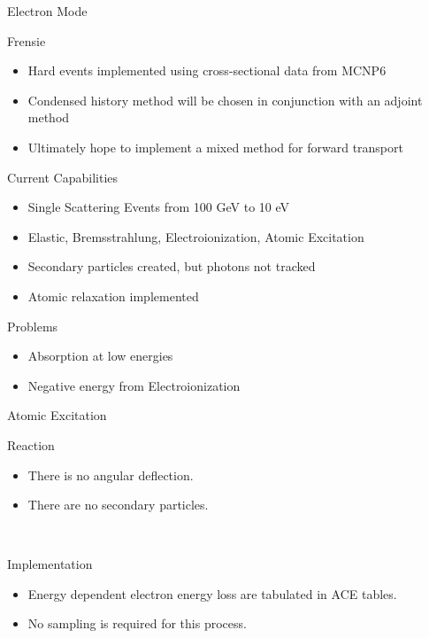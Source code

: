 \documentclass{beamer}
\begin{document}
\begin{frame}{Electron Mode}

  \begin{block}{Frensie}
    \begin{itemize}
      \item Hard events implemented using cross-sectional data from MCNP6
      \item Condensed history method will be chosen in conjunction with an adjoint method
      \item Ultimately hope to implement a mixed method for forward transport
    \end{itemize}    
  \end{block}
  
  \begin{block}{Current Capabilities}
    \begin{itemize}
      \item Single Scattering Events from 100 GeV to 10 eV
      \item Elastic, Bremsstrahlung, Electroionization, Atomic Excitation 
      \item Secondary particles created, but photons not tracked
      \item Atomic relaxation implemented
    \end{itemize}
  \end{block}
    
  \begin{block}{Problems}
    \begin{itemize}
      \item Absorption at low energies
      \item Negative energy from Electroionization
    \end{itemize}    
  \end{block}  

\end{frame}

\begin{frame}{Atomic Excitation}

  \begin{block}{Reaction}
    \begin{itemize}
      \item There is no angular deflection.
      \item There are no secondary particles.
    \end{itemize}
  \end{block}  

~~\\
  \begin{block}{Implementation}
    \begin{itemize}
      \item Energy dependent electron energy loss are tabulated in ACE tables.
      \item No sampling is required for this process.   
    \end{itemize}
  \end{block}  

\end{frame}
\end{document}

